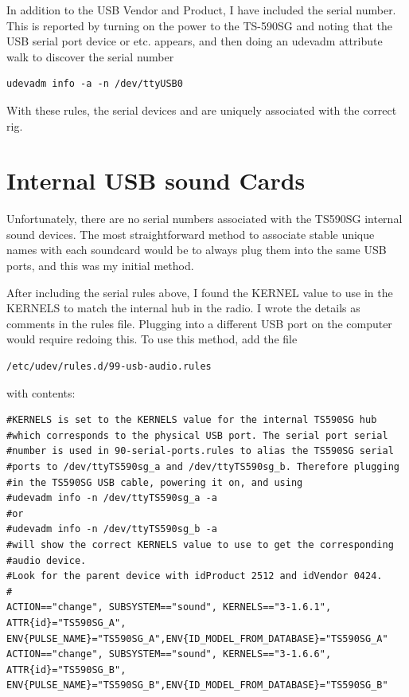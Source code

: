 \documentclass[12pt]{article}
\begin{document}
In addition to the USB Vendor and Product, I have included
the serial number. This is reported by turning on the power to the
TS-590SG and noting that the USB serial port device
 or  etc. appears, and then
doing an udevadm attribute walk to discover the serial number
\begin{verbatim}
udevadm info -a -n /dev/ttyUSB0
\end{verbatim}

With these rules, the serial devices
 and  are uniquely
associated with the correct rig.

\section{Internal USB sound Cards}
Unfortunately, there are no serial numbers associated with the TS590SG
internal sound devices. The most straightforward method to associate
stable unique names with each soundcard would be to always plug them
into the same USB ports, and this was my initial method. 


After including the serial rules above, I found
the KERNEL value to use in the KERNELS to match the internal hub in the radio.
I wrote the details as comments in the rules file.
Plugging into a different USB port on the computer would
require redoing this. To use this method, add the file
\begin{verbatim}
/etc/udev/rules.d/99-usb-audio.rules
\end{verbatim}
with contents:
\begin{verbatim}
#KERNELS is set to the KERNELS value for the internal TS590SG hub
#which corresponds to the physical USB port. The serial port serial
#number is used in 90-serial-ports.rules to alias the TS590SG serial
#ports to /dev/ttyTS590sg_a and /dev/ttyTS590sg_b. Therefore plugging
#in the TS590SG USB cable, powering it on, and using
#udevadm info -n /dev/ttyTS590sg_a -a
#or
#udevadm info -n /dev/ttyTS590sg_b -a
#will show the correct KERNELS value to use to get the corresponding
#audio device.
#Look for the parent device with idProduct 2512 and idVendor 0424.
#
ACTION=="change", SUBSYSTEM=="sound", KERNELS=="3-1.6.1", ATTR{id}="TS590SG_A",
ENV{PULSE_NAME}="TS590SG_A",ENV{ID_MODEL_FROM_DATABASE}="TS590SG_A"
ACTION=="change", SUBSYSTEM=="sound", KERNELS=="3-1.6.6", ATTR{id}="TS590SG_B",
ENV{PULSE_NAME}="TS590SG_B",ENV{ID_MODEL_FROM_DATABASE}="TS590SG_B"
\end{verbatim}
\end{document}
